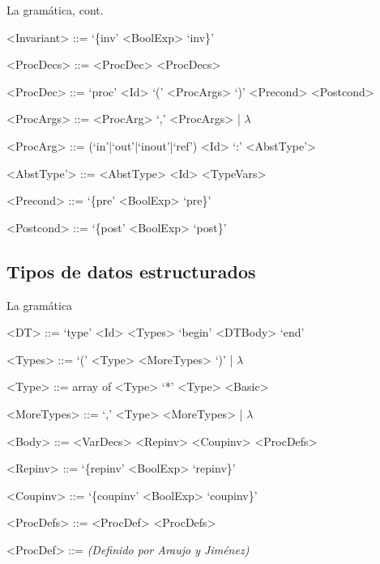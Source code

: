 \begin{frame}[fragile]{La gramática, cont.}
\scriptsize
\begin{grammar}

<Invariant> ::= `\{inv' <BoolExp> `inv\}'

<ProcDecs> ::= <ProcDec> <ProcDecs>

<ProcDec> ::= `proc' <Id> `(' <ProcArgs> `)' <Precond> <Postcond>

<ProcArgs> ::= <ProcArg> `,' <ProcArgs> | $\lambda$

<ProcArg> ::= (`in'|`out'|`inout'|`ref') <Id> `:' <AbstType'>

<AbstType'> ::= <AbstType>
\alt <Id> <TypeVars>

<Precond> ::= `\{pre' <BoolExp> `pre\}'

<Postcond> ::= `\{post' <BoolExp> `post\}'

\end{grammar}
\end{frame}


\subsection{Tipos de datos estructurados}
\begin{frame}[fragile]{La gramática}
\scriptsize
\begin{grammar}

<DT> ::= `type' <Id> <Types> `begin' <DTBody> `end'


<Types> ::= `(' <Type> <MoreTypes> `)' | $\lambda$

<Type> ::= array of <Type>
\alt `*' <Type>
\alt <Basic>

<MoreTypes> ::= `,' <Type> <MoreTypes> | $\lambda$

<Body> ::= <VarDecs> <Repinv> <Coupinv> <ProcDefs>

<Repinv> ::= `\{repinv' <BoolExp> `repinv\}'

<Coupinv> ::= `\{coupinv' <BoolExp> `coupinv\}'

<ProcDefs> ::= <ProcDef> <ProcDefs>

<ProcDef> ::= \textit{(Definido por Araujo y Jiménez)}

\end{grammar}
\end{frame}


